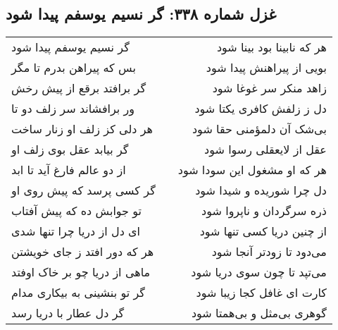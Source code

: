 \begin{center}
\section*{غزل شماره ۳۳۸: گر نسیم یوسفم پیدا شود}
\label{sec:338}
\begin{longtable}{l p{0.5cm} r}
گر نسیم یوسفم پیدا شود
&&
هر که نابینا بود بینا شود
\\
بس که پیراهن بدرم تا مگر
&&
بویی از پیراهنش پیدا شود
\\
گر برافتد برقع از پیش رخش
&&
زاهد منکر سر غوغا شود
\\
ور برافشاند سر زلف دو تا
&&
دل ز زلفش کافری یکتا شود
\\
هر دلی کز زلف او زنار ساخت
&&
بی‌شک آن دلمؤمنی حقا شود
\\
گر بیابد عقل بوی زلف او
&&
عقل از لایعقلی رسوا شود
\\
از دو عالم فارغ آید تا ابد
&&
هر که او مشغول این سودا شود
\\
گر کسی پرسد که پیش روی او
&&
دل چرا شوریده و شیدا شود
\\
تو جوابش ده که پیش آفتاب
&&
ذره سرگردان و ناپروا شود
\\
ای دل از دریا چرا تنها شدی
&&
از چنین دریا کسی تنها شود
\\
هر که دور افتد ز جای خویشتن
&&
می‌دود تا زودتر آنجا شود
\\
ماهی از دریا چو بر خاک اوفتد
&&
می‌تپد تا چون سوی دریا شود
\\
گر تو بنشینی به بیکاری مدام
&&
کارت ای غافل کجا زیبا شود
\\
گر دل عطار با دریا رسد
&&
گوهری بی‌مثل و بی‌همتا شود
\\
\end{longtable}
\end{center}
